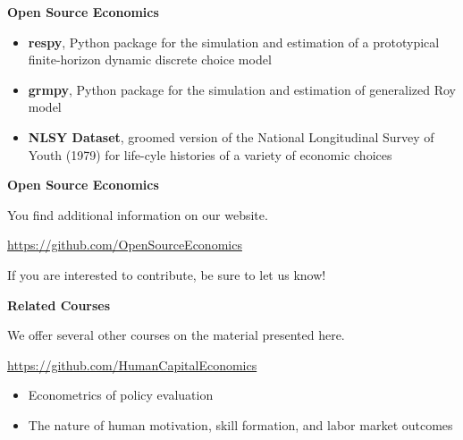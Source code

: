 \begin{frame}\textbf{Open Source Economics}\vspace{0.3cm}

\begin{itemize}\setlength\itemsep{1em}
\item \textbf{respy}, Python package for the simulation and estimation of a prototypical finite-horizon dynamic discrete choice model
\item \textbf{grmpy}, Python package for the simulation and estimation of generalized Roy model
\item \textbf{NLSY Dataset}, groomed version of the National Longitudinal Survey of Youth (1979) for life-cyle histories of a variety of economic choices
\end{itemize}

\end{frame}
\begin{frame}
	\textbf{Open Source Economics}\vspace{0.3cm}

You find additional information on our website.

\begin{center}
\url{https://github.com/OpenSourceEconomics}
\end{center}

If you are interested to contribute, be sure to let us know!

\end{frame}
\begin{frame}
	\textbf{Related Courses}\vspace{0.3cm}

We offer several other courses on the material presented here.

	\begin{center}
	\url{https://github.com/HumanCapitalEconomics}
	\end{center}


	\begin{itemize}\setlength\itemsep{1em}
	\item Econometrics of policy evaluation
	\item The nature of human motivation, skill formation, and labor market outcomes
	\end{itemize}

\end{frame}
